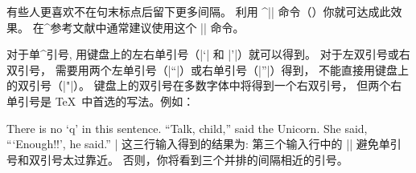 {%
有些人更喜欢不在句末标点后留下更多间隔。
利用 ^|\frenchspacing| 命令（\xref\frenchspacing ）你就可达成此效果。
在^{参考文献}中通常建议使用这个 |\frenchspacing| 命令。

对于单^{引号}, 用键盘上的左右单引号（|`| 和 |'|）就可以得到。
对于左双引号或右双引号，
需要用两个左单引号（|``|）或右单引号（|''|）得到，
不能直接用键盘上的双引号（|"|）。
键盘上的双引号在多数字体中将得到一个右双引号，
但两个右单引号是 \TeX\ 中首选的写法。例如：

\vbox{%
\csdisplay
There is no `q' in this sentence.
``Talk, child,'' said the Unicorn.
She said, ``\thinspace`Enough!!', he said.''
|
}%
这三行输入得到的结果为:
\noindent
第三个输入行中的 |\thinspace| 避免单引号和双引号太过靠近。
否则，你将看到三个并排的间隔相近的引号。

}
